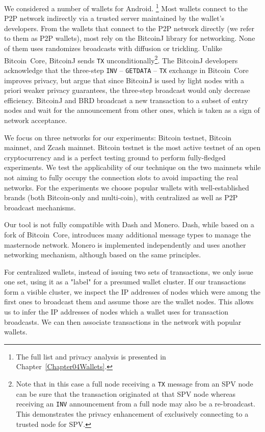 We considered a number of wallets for Android.
\footnote{The full list and privacy analysis is presented in Chapter~\ref{Chapter04Wallets}.}
Most wallets connect to the P2P network indirectly via a trusted server maintained by the wallet's developers.
From the wallets that connect to the P2P network directly (we refer to them as P2P wallets), most rely on the BitcoinJ library for networking.
None of them uses randomizes broadcasts with diffusion or trickling.
Unlike Bitcoin~Core, BitcoinJ sends \texttt{TX} unconditionally\footnote{Note that in this case a full node receiving a \texttt{TX} message from an SPV node can be sure that the transaction originated at that SPV node whereas receiving an \texttt{INV} announcement from a full node may also be a re-broadcast. This demonstrates the privacy enhancement of exclusively connecting to a trusted node for SPV.}.
The BitcoinJ developers acknowledge that the three-step \texttt{INV} -- \texttt{GETDATA} -- \texttt{TX} exchange in Bitcoin~Core improves privacy, but argue that since BitcoinJ is used by light nodes with a priori weaker privacy guarantees, the three-step broadcast would only decrease efficiency.
BitcoinJ and BRD broadcast a new transaction to a subset of entry nodes and wait for the announcement from other ones, which is taken as a sign of network acceptance.

We focus on three networks for our experiments: Bitcoin testnet, Bitcoin mainnet, and Zcash mainnet.
Bitcoin testnet is the most active testnet of an open cryptocurrency and is a perfect testing ground to perform fully-fledged experiments.
We test the applicability of our technique on the two mainnets while not aiming to fully occupy the connection slots to avoid impacting the real networks.
For the experiments we choose popular wallets with well-established brands (both Bitcoin-only and multi-coin), with centralized as well as P2P broadcast mechanisms.

Our tool is not fully compatible with Dash and Monero.
Dash, while based on a fork of Bitcoin~Core, introduces many additional message types to manage the masternode network.
Monero is implemented independently and uses another networking mechanism, although based on the same principles.

For centralized wallets, instead of issuing two sets of transactions, we only issue one set, using it as a "label" for a presumed wallet cluster.
If our transactions form a visible cluster, we inspect the IP addresses of nodes which were among the first ones to broadcast them and assume those are the wallet nodes.
This allows us to infer the IP addresses of nodes which a wallet uses for transaction broadcasts.
We can then associate transactions in the network with popular wallets.


